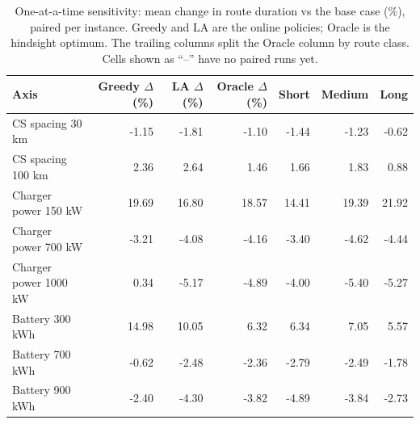 \begin{table}[ht]\centering
\caption{One-at-a-time sensitivity: mean change in route duration vs the base case (\%), paired per instance.  Greedy and LA are the online policies; Oracle is the hindsight optimum.  The trailing columns split the Oracle column by route class.  Cells shown as ``--'' have no paired runs yet.}
\label{tab:sensitivity}
\begin{tabular}{lrrrrrr}
\hline
Axis & Greedy $\Delta$ (\%) & LA $\Delta$ (\%) & Oracle $\Delta$ (\%) & Short & Medium & Long \\
\hline
CS spacing 30 km & -1.15 & -1.81 & -1.10 & -1.44 & -1.23 & -0.62 \\
CS spacing 100 km & 2.36 & 2.64 & 1.46 & 1.66 & 1.83 & 0.88 \\
Charger power 150 kW & 19.69 & 16.80 & 18.57 & 14.41 & 19.39 & 21.92 \\
Charger power 700 kW & -3.21 & -4.08 & -4.16 & -3.40 & -4.62 & -4.44 \\
Charger power 1000 kW & 0.34 & -5.17 & -4.89 & -4.00 & -5.40 & -5.27 \\
Battery 300 kWh & 14.98 & 10.05 & 6.32 & 6.34 & 7.05 & 5.57 \\
Battery 700 kWh & -0.62 & -2.48 & -2.36 & -2.79 & -2.49 & -1.78 \\
Battery 900 kWh & -2.40 & -4.30 & -3.82 & -4.89 & -3.84 & -2.73 \\
\hline
\end{tabular}
\end{table}
